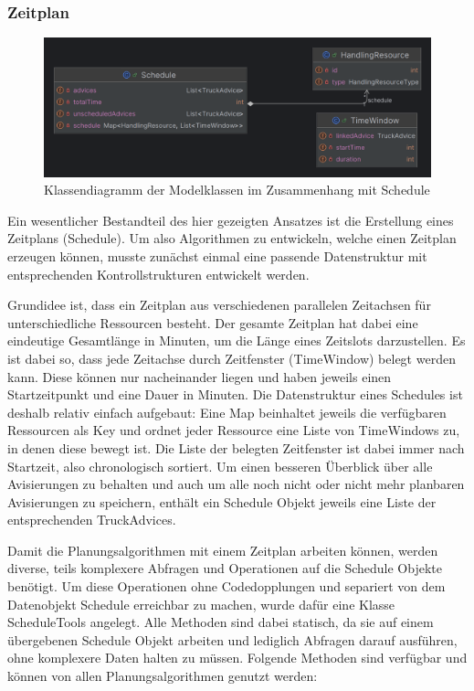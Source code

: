 \subsubsection{Zeitplan}

\begin{figure}[H]
    \centering
    \includegraphics[width=\textwidth]{images/classDiagrams/Schedule_ClassDiagram.png}
    \caption{Klassendiagramm der Modelklassen im Zusammenhang mit Schedule}
    \label{fig:classDiagramSchedule}
\end{figure}

Ein wesentlicher Bestandteil des hier gezeigten Ansatzes ist die Erstellung eines Zeitplans (Schedule). Um also Algorithmen zu entwickeln, welche einen Zeitplan erzeugen können, musste zunächst einmal eine passende Datenstruktur mit entsprechenden Kontrollstrukturen entwickelt werden. 

Grundidee ist, dass ein Zeitplan aus verschiedenen parallelen Zeitachsen für unterschiedliche Ressourcen besteht. Der gesamte Zeitplan hat dabei eine eindeutige Gesamtlänge in Minuten, um die Länge eines Zeitslots darzustellen. Es ist dabei so, dass jede Zeitachse durch Zeitfenster (TimeWindow) belegt werden kann. Diese können nur nacheinander liegen und haben jeweils einen Startzeitpunkt und eine Dauer in Minuten. Die Datenstruktur eines Schedules ist deshalb relativ einfach aufgebaut: Eine Map beinhaltet jeweils die verfügbaren Ressourcen als Key und ordnet jeder Ressource eine Liste von TimeWindows zu, in denen diese bewegt ist. Die Liste der belegten Zeitfenster ist dabei immer nach Startzeit, also chronologisch sortiert. Um einen besseren Überblick über alle Avisierungen zu behalten und auch um alle noch nicht oder nicht mehr planbaren Avisierungen zu speichern, enthält ein Schedule Objekt jeweils eine Liste der entsprechenden TruckAdvices. 

Damit die Planungsalgorithmen mit einem Zeitplan arbeiten können, werden diverse, teils komplexere Abfragen und Operationen auf die Schedule Objekte benötigt. Um diese Operationen ohne Codedopplungen und separiert von dem Datenobjekt Schedule erreichbar zu machen, wurde dafür eine Klasse ScheduleTools angelegt. Alle Methoden sind dabei statisch, da sie auf einem übergebenen Schedule Objekt arbeiten und lediglich Abfragen darauf ausführen, ohne komplexere Daten halten zu müssen. Folgende Methoden sind verfügbar und können von allen Planungsalgorithmen genutzt werden:

